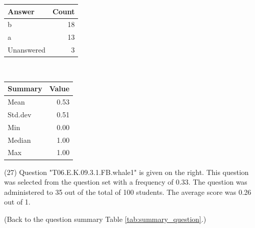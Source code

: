 \documentclass[12pt,nohyper]{tufte-handout}\usepackage[]{graphicx}\usepackage[]{color}
\begin{document}
\begin{center}%
\begin{tabular}{lr}
  \hline
Answer & Count \\ 
  \hline
b &  18 \\ 
  a &  13 \\ 
  Unanswered &   3 \\ 
   \hline
\end{tabular}
~~~~~~~~%
\begin{tabular}{lr}
  \hline
Summary & Value \\ 
  \hline
Mean & 0.53 \\ 
  Std.dev & 0.51 \\ 
  Min & 0.00 \\ 
  Median & 1.00 \\ 
  Max & 1.00 \\ 
   \hline
\end{tabular}
\end{center}\newpage{} (27) Question "T06.E.K.09.3.1.FB.whale1" is given on the right. This question was selected from the question set with a frequency of 0.33. The question was administered to 35 out of the total of 100 students. The average score was 0.26 out of 1.

 (Back to the question summary Table \ref{tab:summary_question}.)
\end{document}
